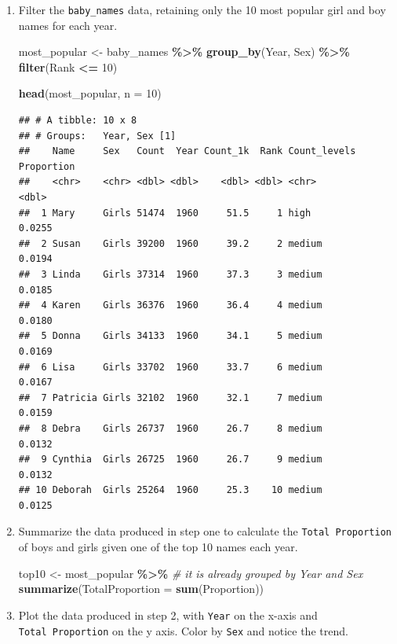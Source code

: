 \documentclass[
]{book}
\newenvironment{Shaded}{\begin{snugshade}}{\end{snugshade}}
\newcommand{\CommentTok}[1]{\textcolor[rgb]{0.56,0.35,0.01}{\textit{#1}}}
\newcommand{\DataTypeTok}[1]{\textcolor[rgb]{0.13,0.29,0.53}{#1}}
\newcommand{\DecValTok}[1]{\textcolor[rgb]{0.00,0.00,0.81}{#1}}
\newcommand{\KeywordTok}[1]{\textcolor[rgb]{0.13,0.29,0.53}{\textbf{#1}}}
\newcommand{\NormalTok}[1]{#1}
\newcommand{\OperatorTok}[1]{\textcolor[rgb]{0.81,0.36,0.00}{\textbf{#1}}}
\newcommand{\StringTok}[1]{\textcolor[rgb]{0.31,0.60,0.02}{#1}}
\begin{document}
\begin{enumerate}
\def\labelenumi{\arabic{enumi}.}
\item
  Filter the \texttt{baby\_names} data, retaining only the 10 most popular girl and boy names for each year.

\begin{Shaded}
\begin{Highlighting}[]
\NormalTok{most\_popular \textless{}{-}}\StringTok{ }
\StringTok{  }\NormalTok{baby\_names }\OperatorTok{\%\textgreater{}\%}\StringTok{ }
\StringTok{  }\KeywordTok{group\_by}\NormalTok{(Year, Sex) }\OperatorTok{\%\textgreater{}\%}
\StringTok{  }\KeywordTok{filter}\NormalTok{(Rank }\OperatorTok{\textless{}=}\StringTok{ }\DecValTok{10}\NormalTok{)}

\KeywordTok{head}\NormalTok{(most\_popular, }\DataTypeTok{n =} \DecValTok{10}\NormalTok{)}
\end{Highlighting}
\end{Shaded}

\begin{verbatim}
## # A tibble: 10 x 8
## # Groups:   Year, Sex [1]
##    Name     Sex   Count  Year Count_1k  Rank Count_levels Proportion
##    <chr>    <chr> <dbl> <dbl>    <dbl> <dbl> <chr>             <dbl>
##  1 Mary     Girls 51474  1960     51.5     1 high             0.0255
##  2 Susan    Girls 39200  1960     39.2     2 medium           0.0194
##  3 Linda    Girls 37314  1960     37.3     3 medium           0.0185
##  4 Karen    Girls 36376  1960     36.4     4 medium           0.0180
##  5 Donna    Girls 34133  1960     34.1     5 medium           0.0169
##  6 Lisa     Girls 33702  1960     33.7     6 medium           0.0167
##  7 Patricia Girls 32102  1960     32.1     7 medium           0.0159
##  8 Debra    Girls 26737  1960     26.7     8 medium           0.0132
##  9 Cynthia  Girls 26725  1960     26.7     9 medium           0.0132
## 10 Deborah  Girls 25264  1960     25.3    10 medium           0.0125
\end{verbatim}
\item
  Summarize the data produced in step one to calculate the \texttt{Total\ Proportion} of boys and girls given one of the top 10 names each year.

\begin{Shaded}
\begin{Highlighting}[]
\NormalTok{top10 \textless{}{-}}\StringTok{ }
\StringTok{  }\NormalTok{most\_popular }\OperatorTok{\%\textgreater{}\%}\StringTok{ }\CommentTok{\# it is already grouped by Year and Sex}
\StringTok{  }\KeywordTok{summarize}\NormalTok{(}\DataTypeTok{TotalProportion =} \KeywordTok{sum}\NormalTok{(Proportion))}
\end{Highlighting}
\end{Shaded}
\item
  Plot the data produced in step 2, with \texttt{Year} on the x-axis and \texttt{Total\ Proportion} on the y axis. Color by \texttt{Sex} and notice the trend.


\end{enumerate}
\end{document}
